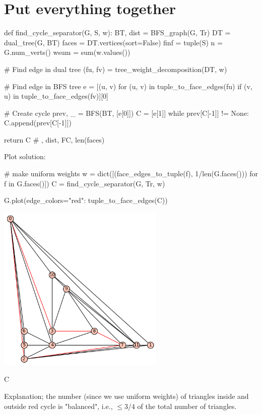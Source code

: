 \section*{Put everything together}

\begin{sageCell}
def find_cycle_separator(G, S, w):
    BT, dist = BFS_graph(G, Tr)
    DT = dual_tree(G, BT)
    faces = DT.vertices(sort=False)
    finf = tuple(S)
    n = G.num_verts()
    wsum = sum(w.values())

    # Find edge in dual tree
    (fu, fv) = tree_weight_decomposition(DT, w)

    # Find edge in BFS tree
    e = [(u, v) for (u, v) in tuple_to_face_edges(fu) if (v, u) in tuple_to_face_edges(fv)][0]

    # Create cycle
    prev, _ = BFS(BT, [e[0]])
    C = [e[1]]
    while prev[C[-1]] != None:
        C.append(prev[C[-1]])

    return C # , dist, FC, len(faces)
\end{sageCell}
Plot solution:
\begin{sageCell}
    # make uniform weights
    w = dict([(face_edges_to_tuple(f), 1/len(G.faces())) for f in G.faces()])
    C = find_cycle_separator(G, Tr, w)
\end{sageCell}

\begin{sageCell}
    G.plot(edge_colors={"red": tuple_to_face_edges(C)})
\end{sageCell}
\begin{outImage}
    \includegraphics[width=0.6\textwidth]{Images/BalancedSeparators/cycle_separator.png}
\end{outImage}

\begin{sageCell}
    C
\end{sageCell}
\begin{outCell}
    [8, 3, 0, 2, 7]
\end{outCell}
Explanation; the number (since we use uniform weights) of triangles inside and outside red cycle is "balanced", i.e., $\leq 3/4$ of the total number of triangles.
